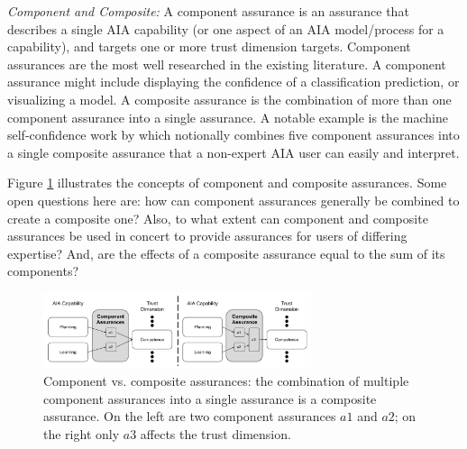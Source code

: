 \emph{Component and Composite:}
A component assurance is an assurance that describes a single AIA capability (or one aspect of an AIA model/process for a capability), and targets one or more trust dimension targets.  Component assurances are the most well researched in the existing literature. A component assurance might include displaying the confidence of a classification prediction, or visualizing a model. A composite assurance is the combination of more than one component assurance into a single assurance. 
A notable example is the machine self-confidence work by \citet{Aitken2016-cv} which notionally combines five component assurances into a single composite assurance that a non-expert AIA user can easily and interpret. 

Figure \ref{fig:assurance_mapping} illustrates the concepts of component and composite assurances. Some open questions here are: how can component assurances generally be combined to create a composite one? Also, to what extent can component and composite assurances be used in concert to provide assurances for users of differing expertise? And, are the effects of a composite assurance equal to the sum of its components?

\begin{figure}[!htbp]
    \centering
    \includegraphics[width=0.7\textwidth]{Figures/Assurance_component_composite.pdf}
    \caption{
    Component vs. composite assurances: the combination of multiple component assurances into a single assurance is a composite assurance. On the left are two component assurances $a1$ and $a2$; on the right only $a3$ affects the trust dimension.}
    \label{fig:assurance_mapping}
\end{figure}
